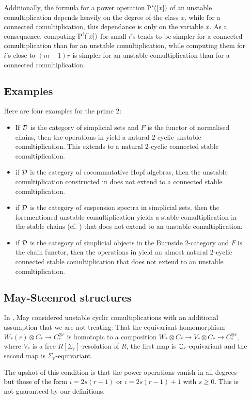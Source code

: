 Additionally, the formula for a power operation $\operatorname{P}^i([x])$ of an unstable comultiplication depends heavily on the degree of the class $x$, while for a connected comultiplication, this dependance is only on the variable $x$. As a consequence, computing $\operatorname{P}^i([x])$ for small $i$'s tends to be simpler for a connected comultiplication than for an unstable comultiplication, while computing them for $i$'s close to $(m-1)r$ is simpler for an unstable comultiplication than for a connected comultiplication. 


\subsection{Examples}
Here are four examples for the prime $2$:
\begin{itemize}
    \item If $\mathcal{D}$ is the category of simplicial sets and $F$ is the functor of normalised chains, then the operations in \cite{steenrod1947products} yield a natural $2$-cyclic unstable comultiplication. This extends to a natural $2$-cyclic connected stable comultiplication.
    \item if $\mathcal{D}$ is the category of cocommutative Hopf algebras, then the unstable comultiplication constructed in \cite{may1970general} does not extend to a connected stable comultiplication.
    \item if $\mathcal{D}$ is the category of suspension spectra in simplicial sets, then the forementioned unstable comultiplication yields a stable comultiplication in the stable chains (cf. \cite{Gill2020}) that does not extend to an unstable comultiplication.
    \item if $\mathcal{D}$ is the category of simplicial objects in the Burnside $2$-category and $F$ is the chain functor, then the operations in \cite{cantero-moran2020khovanov} yield an almost natural $2$-cyclic connected stable comultiplication that does not extend to an unstable comultiplication.
    
\end{itemize}










\subsection{May-Steenrod structures} In \cite{may1970general}, May considered unstable cyclic comultiplications with an additional assumption that we are not treating: That %
the equivariant homomorphism $W_*(r)\otimes C_*\to C_*^{\otimes r}$ is homotopic to a composition $W_*\otimes C_*\to V_*\otimes C_*\to C_*^{\otimes r}$, where $V_*$ is a free $R[\Sigma_r]$-resolution of $R$, the first map is $\mathbb{C}_r$-equivariant and the second map is $\Sigma_r$-equivariant.

The upshot of this condition is that the power operations vanish in all degrees but those of the form $i = 2s(r-1)$ or $i = 2s(r-1)+1$ with $s\geq 0$. This is not guaranteed by our definitions.
